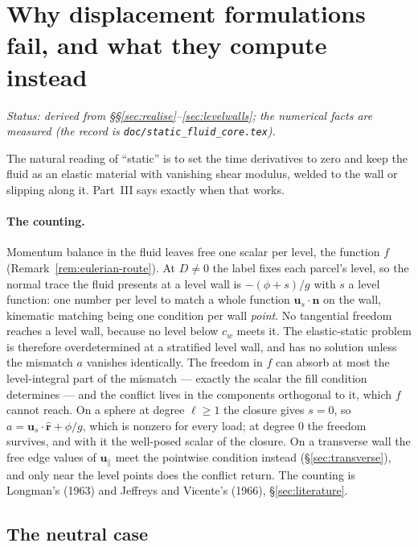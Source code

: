 \documentclass[11pt]{article}
\theoremstyle{definition}
\theoremstyle{remark}
\newcommand{\bu}{\mathbf{u}}
\newcommand{\bn}{\mathbf{n}}
\newcommand{\code}[1]{\texttt{#1}}
\newcommand{\status}[1]{\noindent\emph{Status: #1}\par\smallskip}
\begin{document}
\section{Why displacement formulations fail, and what they compute instead}
\label{sec:fail}
\label{sec:why}

\status{derived from \S\S\ref{sec:realise}--\ref{sec:levelwalls}; the
numerical facts are measured (the record is
\code{doc/static\_fluid\_core.tex}).}

The natural reading of ``static'' is to set the time derivatives to
zero and keep the fluid as an elastic material with vanishing shear
modulus, welded to the wall or slipping along it. Part~III says exactly
when that works.

\paragraph{The counting.} Momentum balance in the fluid leaves free one
scalar per level, the function $f$ (Remark~\ref{rem:eulerian-route}).
At $D \ne 0$ the label fixes each parcel's level, so the normal trace
the fluid presents at a level wall is $-(\phi + s)/g$ with $s$ a level
function: one number per level to match a whole function
$\bu_s\cdot\bn$ on the wall, kinematic matching being one condition per
wall \emph{point}. No tangential freedom reaches a level wall, because
no level below $c_w$ meets it. The elastic-static problem is therefore
overdetermined at a stratified level wall, and has no solution unless
the mismatch $a$ vanishes identically. The freedom in $f$ can absorb at
most the level-integral part of the mismatch --- exactly the scalar the
fill condition determines --- and the conflict lives in the components
orthogonal to it, which $f$ cannot reach. On a sphere at degree $\ell
\ge 1$ the closure gives $s = 0$, so $a = \bu_s\cdot\hat{\mathbf r} +
\phi/g$, which is nonzero for every load; at degree $0$ the freedom
survives, and with it the well-posed scalar of the closure. On a
transverse wall the free edge values of $\bu_\parallel$ meet the
pointwise condition instead (\S\ref{sec:transverse}), and only near the
level points does the conflict return. The counting is Longman's
(1963) and Jeffreys and Vicente's (1966), \S\ref{sec:literature}.

\subsection{The neutral case}
\label{sec:counting}
\end{document}
